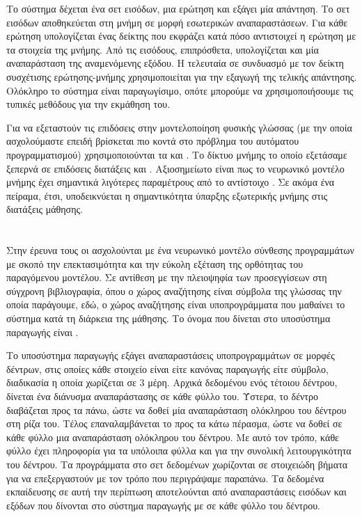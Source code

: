 Το σύστημα δέχεται ένα σετ εισόδων, μια ερώτηση και εξάγει μία απάντηση. 
Το σετ εισόδων αποθηκεύεται στη μνήμη σε μορφή εσωτερικών αναπαραστάσεων. Για κάθε ερώτηση υπολογίζεται ένας δείκτης που εκφράζει κατά πόσο αντιστοιχεί η ερώτηση με τα στοιχεία της μνήμης.
Από τις εισόδους, επιπρόσθετα, υπολογίζεται και μία αναπαράσταση της αναμενόμενης εξόδου.
Η τελευταία σε συνδυασμό με τον δείκτη συσχέτισης ερώτησης-μνήμης χρησιμοποιείται για την εξαγωγή της τελικής απάντησης. Ολόκληρο το σύστημα είναι παραγωγίσιμο, οπότε μπορούμε να χρησιμοποιήσουμε τις τυπικές μεθόδους για την εκμάθηση του.

Για να εξεταστούν τις επιδόσεις στην μοντελοποίηση φυσικής γλώσσας (με την οποία ασχολούμαστε επειδή βρίσκεται πιο κοντά στο πρόβλημα του αυτόματου προγραμματισμού) χρησιμοποιούνται τα  και . Το δίκτυο μνήμης το οποίο εξετάσαμε ξεπερνά σε επιδόσεις διατάξεις  και . Αξιοσημείωτο είναι πως το νευρωνικό μοντέλο μνήμης έχει σημαντικά λιγότερες παραμέτρους από το αντίστοιχο . Σε ακόμα ένα πείραμα, έτσι, υποδεικνύεται η σημαντικότητα ύπαρξης εξωτερικής μνήμης στις διατάξεις μάθησης.

\section{}

Στην έρευνα τους οι  \cite{Parisotto2017} ασχολούνται με ένα νευρωνικό μοντέλο σύνθεσης προγραμμάτων με σκοπό την επεκτασιμότητα και την εύκολη εξέταση της ορθότητας του παραγόμενου μοντέλου.
Σε αντίθεση με την πλειοψηφία των προσεγγίσεων στη σύγχρονη βιβλιογραφία, όπου ο χώρος αναζήτησης είναι σύμβολα της γλώσσας την οποία παράγουμε, εδώ, ο χώρος αναζήτησης είναι υποπρογράμματα που μαθαίνει το σύστημα κατά τη διάρκεια της μάθησης. Το όνομα που δίνεται στο υποσύστημα παραγωγής είναι .


Το υποσύστημα παραγωγής εξάγει αναπαραστάσεις υποπρογραμμάτων σε μορφές δέντρων, στις οποίες κάθε στοιχείο είναι είτε κανόνας παραγωγής είτε σύμβολο, διαδικασία η οποία χωρίζεται σε 3 μέρη.
Αρχικά δεδομένου ενός τέτοιου δέντρου, δίνεται ένα διάνυσμα αναπαράστασης σε κάθε φύλλο του.
Ύστερα, το δέντρο διαβάζεται προς τα πάνω, ώστε να δοθεί μία αναπαράσταση ολόκληρου του δέντρου στη ρίζα του.
Τέλος επαναλαμβάνεται το προς τα κάτω πέρασμα, ώστε να δοθεί σε κάθε φύλλο μια αναπαράσταση ολόκληρου του δέντρου.
Με αυτό τον τρόπο, κάθε φύλλο έχει πληροφορία για τα υπόλοιπα φύλλα και για την συνολική λειτουργικότητα του δέντρου. Τα προγράμματα στο σετ δεδομένων χωρίζονται σε στοιχειώδη βήματα για να επεξεργαστούν με τον τρόπο που περιγράψαμε παραπάνω. Τα δεδομένα εκπαίδευσης σε αυτή την περίπτωση αποτελούνται από αναπαραστάσεις εισόδων και εξόδων που δίνονται στο σύστημα παραγωγής με σε κάθε φύλλο του δέντρου.


